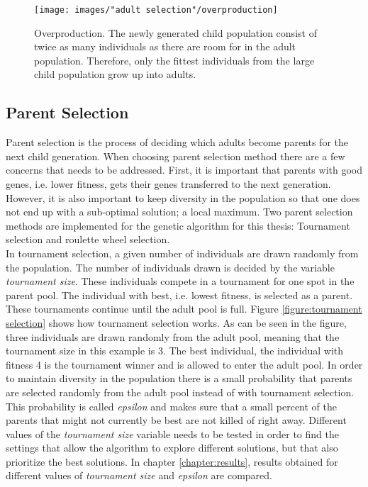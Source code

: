 \begin{figure}[h!]
\begin{center}
\texttt{[image: images/"adult selection"/overproduction]}
\caption{Overproduction. The newly generated child population consist of twice as many individuals as there are room for in the adult population. Therefore, only the fittest individuals from the large child population grow up into adults.}
\label{figure:overproduction}
\end{center}
\end{figure}



\subsection{Parent Selection}\label{subsection:parent selection}
Parent selection is the process of deciding which adults become parents for the next child generation. When choosing parent selection method there are a few concerns that needs to be addressed. First, it is important that parents with good genes, i.e. lower fitness, gets their genes transferred to the next generation. However, it is also important to keep diversity in the population so that one does not end up with a sub-optimal solution; a local maximum. Two parent selection methods are implemented for the genetic algorithm for this thesis: Tournament selection and roulette wheel selection. \\

\noindent In tournament selection, a given number of individuals are drawn randomly from the population. The number of individuals drawn is decided by the variable \textit{tournament size}. These individuals compete in a tournament for one spot in the parent pool. The individual with best, i.e. lowest fitness, is  selected as a parent. These tournaments continue until the adult pool is full. Figure \ref{figure:tournament selection} shows how tournament selection works. As can be seen in the figure, three individuals are drawn randomly from the adult pool, meaning that the tournament size in this example is 3. The best individual, the individual with fitness 4 is the tournament winner and is allowed to enter the adult pool. In order to maintain diversity in the population there is a small probability that parents are selected randomly from the adult pool instead of with tournament selection. This probability is called \textit{epsilon} and makes sure that a small percent of the parents that might not currently be best are not killed of right away. Different values of the \textit{tournament size} variable needs to be tested in order to find the settings that allow the algorithm to explore different solutions, but that also prioritize the best solutions. In chapter \ref{chapter:results}, results obtained for different values of \textit{tournament size} and \textit{epsilon} are compared. \\


